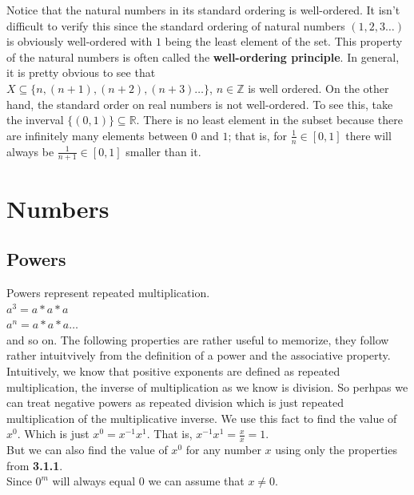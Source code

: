 \documentclass[12pt]{report}
\begin{document}
Notice that the natural numbers in its standard ordering is well-ordered. It isn't difficult to verify this since the standard ordering of natural numbers $(1, 2, 3 \dots)$ is obviously well-ordered with $1$ being the least element of the set. This property of the natural numbers is often called the \textbf{well-ordering principle}. In general, it is pretty obvious to see that \\
$X \subseteq \{n, (n+1), (n+2), (n+3)\dots \}$, $n \in \mathbb{Z}$ is well ordered.
On the other hand, the standard order on real numbers is not well-ordered. To see this, take the inverval $\{(0, 1)\} \subseteq \mathbb{R}$. There is no least element in the subset because there are infinitely many elements between $0$ and $1$; that is, for $\frac{1}{n} \in [0, 1]$ there will always be $\frac{1}{n+1} \in [0, 1]$ smaller than it.


\newpage

\chapter{Numbers}

\newpage

\section{Powers}

Powers represent repeated multiplication.\medskip\\
$a^3=a*a*a$\\
$a^n=a*a*a\dots$\\
and so on.
The following properties are rather useful to memorize, they follow rather intuitvively from the definition of a power and the associative property.
Intuitively, we know that positive exponents are defined as repeated multiplication, the inverse of multiplication as we know is division. So perhpas we can treat negative powers as repeated division which is just repeated multiplication of the multiplicative inverse. We use this fact to find the value of $x^0$. Which is just $x^0=x^{-1}x^1$. That is, $x^{-1}x^1=\frac{x}{x}=1$.\\
But we can also find the value of $x^0$ for any number $x$ using only the properties from \textbf{3.1.1}.\\
Since $0^m$ will always equal 0 we can assume that $x\neq 0$.
\end{document}
